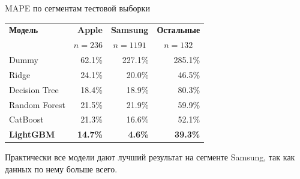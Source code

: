 \documentclass[aspectratio=169,12pt]{beamer}
\begin{document}
\begin{frame}{MAPE по сегментам тестовой выборки}
  \footnotesize
  \centering
  \begin{tabular}{@{}lrrr@{}}
    \toprule
    \textbf{Модель} & \textbf{Apple} & \textbf{Samsung} & \textbf{Остальные} \\
    & \multicolumn{1}{c}{\scriptsize $n{=}236$} &
      \multicolumn{1}{c}{\scriptsize $n{=}1191$} &
      \multicolumn{1}{c}{\scriptsize $n{=}132$} \\
    \midrule
    Dummy & 62.1\% & 227.1\% & 285.1\% \\
    Ridge & 24.1\% & 20.0\% & 46.5\% \\
    Decision Tree & 18.4\% & 18.9\% & 80.3\% \\
    Random Forest & 21.5\% & 21.9\% & 59.9\% \\
    CatBoost & 21.3\% & 16.6\% & 52.1\% \\
    \textbf{LightGBM} & \textbf{14.7\%} & \textbf{4.6\%} & \textbf{39.3\%} \\
    \bottomrule
  \end{tabular}

  \vspace{0.6em}
  \small
  Практически все модели дают лучший результат на сегменте Samsung, так как данных по нему больше всего.
\end{frame}
\end{document}
